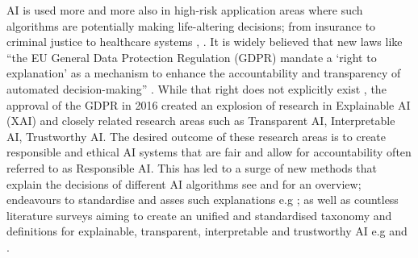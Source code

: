 \documentclass[manuscript,screen,review]{acmart}
\begin{document}



AI is used more and more also in high-risk application areas where such algorithms are potentially making life-altering decisions; from insurance to criminal justice to healthcare systems \cite{Bohr2020}, \cite{Chen2018}. It is widely believed that new laws like “the EU General Data Protection Regulation (GDPR) mandate a ‘right to explanation’ as a mechanism to enhance the accountability and transparency of automated decision-making” \cite{Wachter2017}. While that right does not explicitly exist \cite{Wachter2017}, the approval of the GDPR in 2016 created an explosion of research in Explainable AI (XAI) and closely related research areas such as Transparent AI, Interpretable AI, Trustworthy AI. The desired outcome of these research areas is to create responsible and ethical AI systems that are fair and allow for accountability \cite{Mohseni2021} often referred to as Responsible AI. This has led to a surge of new methods that explain the decisions of different AI algorithms see \cite{Linardatos2021} and \cite{Guidotti2018a} for an overview; endeavours to standardise and asses such explanations e.g \cite{Gilpin2019}; as well as countless literature surveys aiming to create an unified and standardised taxonomy and definitions for explainable, transparent, interpretable and trustworthy AI e.g \cite{Schwalbe2021} and \cite{Arrieta2020}.
\end{document}
